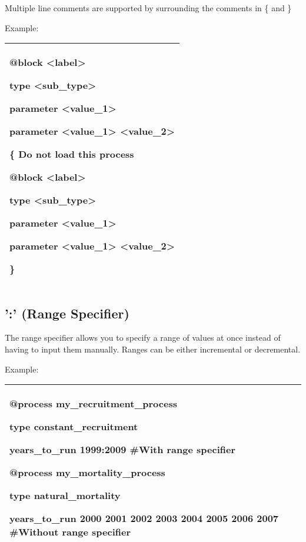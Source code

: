 \documentclass[a4paper,11pt,twoside,pdftex,draft]{article}
\begin{document}
Multiple line comments are supported by surrounding the comments in \{
and \}

Example:

\begin{longtable}[]{@{}l@{}}
\toprule
\endhead
\begin{minipage}[t]{0.97\columnwidth}\raggedright
@block \textless label\textgreater{}

type \textless sub\_type\textgreater{}

parameter \textless value\_1\textgreater{}

parameter \textless value\_1\textgreater{}
\textless value\_2\textgreater{}

\{ Do not load this process

@block \textless label\textgreater{}

type \textless sub\_type\textgreater{}

parameter \textless value\_1\textgreater{}

parameter \textless value\_1\textgreater{}
\textless value\_2\textgreater{}

\}\strut
\end{minipage}\tabularnewline
\bottomrule
\end{longtable}

\hypertarget{range-specifier}{%
\subsection{':' (Range Specifier)}\label{range-specifier}}

The range specifier allows you to specify a range of values at once
instead of having to input them manually. Ranges can be either
incremental or decremental.

Example:

\begin{longtable}[]{@{}l@{}}
\toprule
\endhead
\begin{minipage}[t]{0.97\columnwidth}\raggedright
@process my\_recruitment\_process

type constant\_recruitment

years\_to\_run 1999:2009 \#With range specifier

@process my\_mortality\_process

type natural\_mortality

years\_to\_run 2000 2001 2002 2003 2004 2005 2006 2007 \#Without range
specifier\strut
\end{minipage}\tabularnewline
\bottomrule
\end{longtable}
\end{document}
